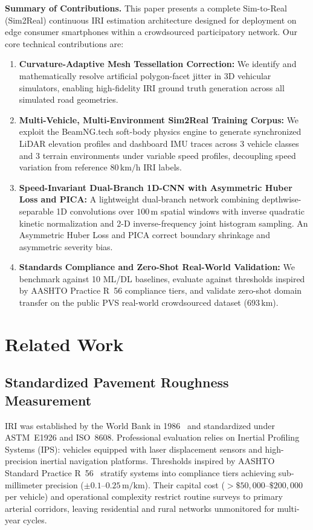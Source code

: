 \documentclass[conference]{IEEEtran}
\begin{document}
\textbf{Summary of Contributions.}
This paper presents a complete Sim-to-Real (Sim2Real) continuous IRI estimation architecture designed for deployment on edge consumer smartphones within a crowdsourced participatory network. Our core technical contributions are:

\begin{enumerate}
    \item \textbf{Curvature-Adaptive Mesh Tessellation Correction:} We identify and mathematically resolve artificial polygon-facet jitter in 3D vehicular simulators, enabling high-fidelity IRI ground truth generation across all simulated road geometries.
    \item \textbf{Multi-Vehicle, Multi-Environment Sim2Real Training Corpus:} We exploit the BeamNG.tech soft-body physics engine to generate synchronized LiDAR elevation profiles and dashboard IMU traces across 3 vehicle classes and 3 terrain environments under variable speed profiles, decoupling speed variation from reference $80\,\text{km/h}$ IRI labels.
    \item \textbf{Speed-Invariant Dual-Branch 1D-CNN with Asymmetric Huber Loss and PICA:} A lightweight dual-branch network combining depthwise-separable 1D convolutions over $100\,\text{m}$ spatial windows with inverse quadratic kinetic normalization and 2-D inverse-frequency joint histogram sampling. An Asymmetric Huber Loss and PICA correct boundary shrinkage and asymmetric severity bias.
    \item \textbf{Standards Compliance and Zero-Shot Real-World Validation:} We benchmark against 10 ML/DL baselines, evaluate against thresholds inspired by AASHTO Practice R~56 compliance tiers, and validate zero-shot domain transfer on the public PVS real-world crowdsourced dataset ($693\,\text{km}$).
\end{enumerate}

\section{Related Work}

\subsection{Standardized Pavement Roughness Measurement}
IRI was established by the World Bank in 1986~\cite{3} and standardized under ASTM~E1926 and ISO~8608. Professional evaluation relies on Inertial Profiling Systems (IPS): vehicles equipped with laser displacement sensors and high-precision inertial navigation platforms. Thresholds inspired by AASHTO Standard Practice R~56~\cite{aashto_r56} stratify systems into compliance tiers achieving sub-millimeter precision ($\pm 0.1$--$0.25\,\text{m/km}$). Their capital cost ($>\$50{,}000$--$\$200{,}000$ per vehicle) and operational complexity restrict routine surveys to primary arterial corridors, leaving residential and rural networks unmonitored for multi-year cycles.
\end{document}
